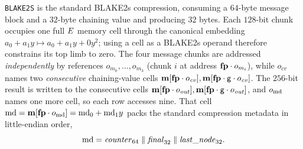 \vspace{5mm}

\texttt{BLAKE2S} is the standard BLAKE2s compression, consuming a $64$-byte message block and a $32$-byte chaining value and producing $32$ bytes. Each $128$-bit chunk occupies one full $E$ memory cell through the canonical embedding $a_0+a_1y\mapsto a_0+a_1y+0y^2$; using a cell as a BLAKE2s operand therefore constrains its top limb to zero. The four message chunks are addressed \emph{independently} by references $o_{m_0},\dots,o_{m_3}$ (chunk $i$ at address $\mathbf{fp}\cdot o_{m_i}$), while $o_{\mathit{cv}}$ names two \emph{consecutive} chaining-value cells $\mathbf{m}[\mathbf{fp}\cdot o_{\mathit{cv}}],\mathbf{m}[\mathbf{fp}\cdot \mathsf{g}\cdot o_{\mathit{cv}}]$. The $256$-bit result is written to the consecutive cells $\mathbf{m}[\mathbf{fp}\cdot o_{\mathit{out}}],\mathbf{m}[\mathbf{fp}\cdot \mathsf{g}\cdot o_{\mathit{out}}]$, and $o_{\mathrm{md}}$ names one more cell, so each row accesses nine. That cell $\mathrm{md}=\mathbf{m}[\mathbf{fp}\cdot o_{\mathrm{md}}]=\mathrm{md}_0+\mathrm{md}_1y$ packs the standard compression metadata in little-endian order,
\[
  \mathrm{md}=\mathit{counter}_{64}\;\Vert\;\mathit{final}_{32}\;\Vert\;\mathit{last\_node}_{32}.
\]


